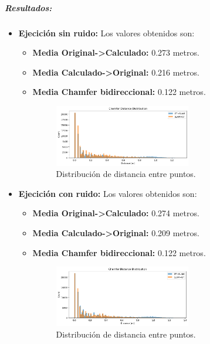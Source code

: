 \documentclass[12pt, a4paper, twoside]{article}
\begin{document}
\subparagraph{Resultados:}
\begin{itemize}
  \item \textbf{Ejecición sin ruido:} Los valores obtenidos son:
  \begin{itemize}
    \item \textbf{Media Original->Calculado:} 0.273 metros.
    \item \textbf{Media Calculado->Original:} 0.216 metros.
    \item \textbf{Media Chamfer bidireccional:} 0.122 metros.
    \begin{figure}[h]
      \centering
        \includegraphics[width=0.6\textwidth]{chamfer_clean.png}
        \caption{Distribución de distancia entre puntos.}
    \end{figure} 
    \end{itemize}
  \item \textbf{Ejecición con ruido:} Los valores obtenidos son:
  \begin{itemize}
    \item \textbf{Media Original->Calculado:} 0.274 metros.
    \item \textbf{Media Calculado->Original:} 0.209 metros.
    \item \textbf{Media Chamfer bidireccional:} 0.122 metros.
    \begin{figure}[h]
      \centering
        \includegraphics[width=0.6\textwidth]{chamfer_noisy.png}
      \caption{Distribución de distancia entre puntos.}
    \end{figure} 
  \end{itemize}
\end{itemize}
\end{document}
